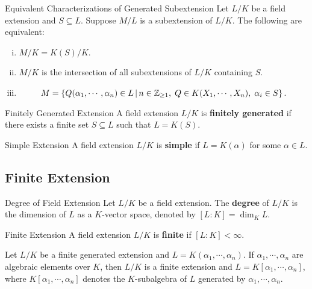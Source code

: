 \begin{proposition}{Equivalent Characterizations of Generated Subextension}{}
    Let $L/K$ be a field extension and $S\subseteq L$. Suppose $M/L$ is a subextension of $L/K$. The following are equivalent:
    \begin{enumerate}[(i)]
        \item $M/K=K(S)/K$.
        \item $M/K$ is the intersection of all subextensions of $L/K$ containing $S$.
        \item 
        \[
        M=\left\{Q(\alpha_1,\cdots,\alpha_n)\in L\,\middle\vert\, n\in \mathbb{Z}_{\ge 1}, \; Q\in K(X_1,\cdots,X_n),\; \alpha_i\in S \right\}.
        \]
    \end{enumerate}
\end{proposition}

\begin{definition}{Finitely Generated Extension}{}
    A field extension $L/K$ is \textbf{finitely generated} if there exists a finite set $S\subseteq L$ such that $L=K(S)$.
\end{definition}

\begin{definition}{Simple Extension}{}
    A field extension $L/K$ is \textbf{simple} if $L=K(\alpha)$ for some $\alpha\in L$.
\end{definition}


\subsection{Finite Extension}

\begin{definition}{Degree of Field Extension}{}
    Let $L/K$ be a field extension. The \textbf{degree} of $L/K$ is the dimension of $L$ as a $K$-vector space, denoted by $[L:K]=\dim_K L$.
\end{definition}

\begin{definition}{Finite Extension}{}
    A field extension $L/K$ is \textbf{finite} if $[L:K]<\infty$.
\end{definition}

\begin{proposition}{}{}
    Let $L/K$ be a finite generated extension and $L=K(\alpha_1,\cdots,\alpha_n)$. If $\alpha_1,\cdots,\alpha_n$ are algebraic elements over $K$, then $L/K$ is a finite extension and $L=K[\alpha_1,\cdots,\alpha_n]$, where $K[\alpha_1,\cdots,\alpha_n]$ denotes the $K$-subalgebra of $L$ generated by $\alpha_1,\cdots,\alpha_n$.
\end{proposition}


